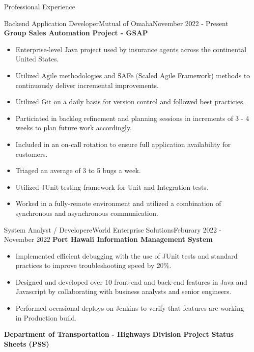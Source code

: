 \documentclass[]{mcdowellcv}
\begin{document}
	\makeheader

	\begin{cvsection}{Professional Experience}
		\begin{cvsubsection}{Backend Application Developer}{Mutual of Omaha}{November 2022 - Present}			
			\textbf{Group Sales Automation Project - GSAP}
			\begin{itemize}
				\item Enterprise-level Java project used by insurance agents across the continental United States.
				\item Utilized Agile methodologies and SAFe (Scaled Agile Framework) methods to continuously deliver incremental improvements.
				\item Utilized Git on a daily basis for version control and followed best practicies.
				\item Particiated in backlog refinement and planning sessions in increments of 3 - 4 weeks to plan future work accordingly.
				\item Included in an on-call rotation to ensure full application availability for customers.
				\item Triaged an average of 3 to 5 bugs a week.
				\item Utilized JUnit testing framework for Unit and Integration tests.
				\item Worked in a fully-remote environment and utilized a combination of synchronous and asynchronous communication.
				\end{itemize}
		\end{cvsubsection}
		\begin{cvsubsection}{System Analyst / Developer}{eWorld Enterprise Solutions}{Feburary 2022 - November 2022}
			\textbf{Port Hawaii Information Management System}
			\begin{itemize}
				\item Implemented efficient debugging with the use of JUnit tests and standard practices to improve troubleshooting speed by 20\%.
				\item Designed and developed over 10 front-end and back-end features in Java and Javascript by collaborating with business analysts and senior engineers.
				\item Performed occasional deploys on Jenkins to verify that features are working in Production build.
			\end{itemize}
			\textbf{Department of Transportation - Highways Division Project Status Sheets (PSS)}
			\begin{itemize}

\end{itemize}
\end{cvsubsection}
\end{cvsection}
\end{document}
